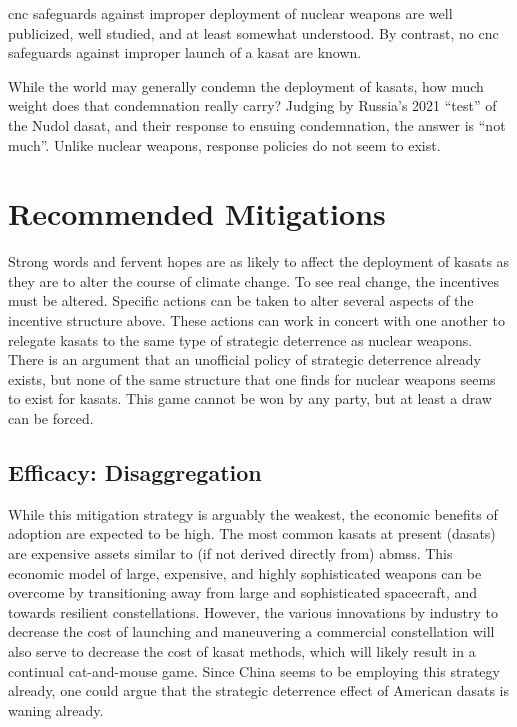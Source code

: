 \ac{cnc} safeguards against improper deployment of nuclear weapons are
well publicized, well studied, and at least somewhat understood.  By
contrast, no \ac{cnc} safeguards against improper launch of a
\ac{kasat} are known.

While the world may generally condemn the deployment of \acp{kasat},
how much weight does that condemnation really carry?  Judging by
Russia's 2021 ``test'' of the Nudol \ac{dasat}, and their response to
ensuing condemnation, the answer is ``not much''.  Unlike nuclear
weapons, response policies do not seem to exist.


\section*{Recommended Mitigations}

Strong words and fervent hopes are as likely to affect the deployment
of \acp{kasat} as they are to alter the course of climate change.  To
see real change, the incentives must be altered.  Specific actions can
be taken to alter several aspects of the incentive structure above.
These actions can work in concert with one another to relegate
\acp{kasat} to the same type of strategic deterrence as nuclear
weapons.  There is an argument that an unofficial policy of strategic
deterrence already exists, but none of the same structure that one
finds for nuclear weapons seems to exist for \acp{kasat}.  This game
cannot be won by any party, but at least a draw can be forced.


\subsection*{Efficacy: Disaggregation}
While this mitigation strategy is arguably the weakest, the economic
benefits of adoption are expected to be high.  The most common
\acp{kasat} at present (\acp{dasat}) are expensive assets similar to
(if not derived directly from) \acp{abms}.\cite[pxiii]{brian} This
economic model of large, expensive, and highly sophisticated weapons
can be overcome by transitioning away from large and sophisticated
spacecraft, and towards resilient constellations.  However, the
various innovations by industry to decrease the cost of launching and
maneuvering a commercial constellation will also serve to decrease the
cost of \ac{kasat} methods, which will likely result in a continual
cat-and-mouse game.  Since China seems to be employing this strategy
already, one could argue that the strategic deterrence effect of
American \acp{dasat} is waning already.

